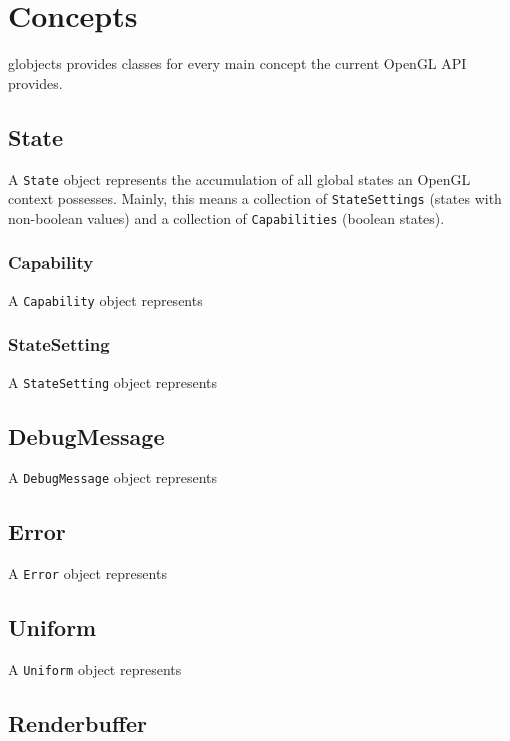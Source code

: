 \documentclass{article}
\begin{document}
\section{Concepts}

globjects provides classes for every main concept the current OpenGL API provides.

\subsection{State}

A \verb|State| object represents the accumulation of all global states an OpenGL context possesses. Mainly, this means a collection of \verb|StateSettings| (states with non-boolean values) and a collection of \verb|Capabilities| (boolean states).

\subsubsection{Capability}

A \verb|Capability| object represents 

\subsubsection{StateSetting}

A \verb|StateSetting| object represents 

\subsection{DebugMessage}

A \verb|DebugMessage| object represents 

\subsection{Error}

A \verb|Error| object represents 

\subsection{Uniform}

A \verb|Uniform| object represents 

\subsection{Renderbuffer}
\end{document}
